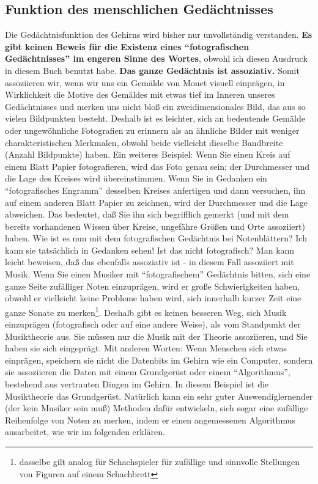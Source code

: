
\subsection{Funktion des menschlichen Gedächtnisses}
\label{c1iii6m}

Die Gedächtnisfunktion des Gehirns wird bisher nur unvollständig verstanden.
\textbf{Es gibt keinen Beweis für die Existenz eines \enquote{fotografischen Gedächtnisses} im engeren Sinne des Wortes}, obwohl ich diesen Ausdruck in diesem Buch benutzt habe.
\textbf{Das ganze Gedächtnis ist assoziativ.}
Somit assoziieren wir, wenn wir uns ein Gemälde von Monet visuell einprägen, in Wirklichkeit die Motive des Gemäldes mit etwas tief im Inneren unseres Gedächtnisses und merken uns nicht bloß ein zweidimensionales Bild, das aus so vielen Bildpunkten besteht.
Deshalb ist es leichter, sich an bedeutende Gemälde oder ungewöhnliche Fotografien zu erinnern als an ähnliche Bilder mit weniger charakteristischen Merkmalen, obwohl beide vielleicht dieselbe Bandbreite (Anzahl Bildpunkte) haben.
Ein weiteres Beispiel: Wenn Sie einen Kreis auf einem Blatt Papier fotografieren, wird das Foto genau sein; der Durchmesser und die Lage des Kreises wird übereinstimmen.
Wenn Sie in Gedanken ein \enquote{fotografisches Engramm} desselben Kreises anfertigen und dann versuchen, ihn auf einem anderen Blatt Papier zu zeichnen, wird der Durchmesser und die Lage abweichen.
Das bedeutet, daß Sie ihn sich begrifflich gemerkt (und mit dem bereits vorhandenen Wissen über Kreise, ungefähre Größen und Orte assoziiert) haben.
Wie ist es nun mit dem fotografischen Gedächtnis bei Notenblättern?
Ich kann sie tatsächlich in Gedanken sehen!
Ist das nicht fotografisch?
Man kann leicht beweisen, daß das ebenfalls assoziativ ist - in diesem Fall assoziiert mit Musik.
Wenn Sie einen Musiker mit \enquote{fotografischem} Gedächtnis bitten, sich eine ganze Seite zufälliger Noten einzuprägen, wird er große Schwierigkeiten haben, obwohl er vielleicht keine Probleme haben wird, sich innerhalb kurzer Zeit eine ganze Sonate zu merken\footnote{dasselbe gilt analog für Schachspieler für zufällige und sinnvolle Stellungen von Figuren auf einem Schachbrett}.
Deshalb gibt es keinen besseren Weg, sich Musik einzuprägen (fotografisch oder auf eine andere Weise), als vom Standpunkt der Musiktheorie aus.
Sie müssen nur die Musik mit der Theorie assoziieren, und Sie haben sie sich eingeprägt.
Mit anderen Worten: Wenn Menschen sich etwas einprägen, speichern sie nicht die Datenbits im Gehirn wie ein Computer, sondern sie assoziieren die Daten mit einem Grundgerüst oder einem \enquote{Algorithmus}, bestehend aus vertrauten Dingen im Gehirn.
In diesem Beispiel ist die Musiktheorie das Grundgerüst.
Natürlich kann ein sehr guter Auswendiglernender (der kein Musiker sein muß) Methoden dafür entwickeln, sich sogar eine zufällige Reihenfolge von Noten zu merken, indem er einen angemessenen Algorithmus ausarbeitet, wie wir im folgenden erklären.

